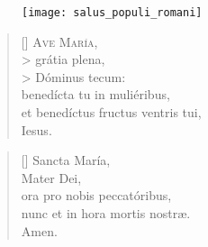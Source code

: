 \documentclass[omni.tex]{subfiles}
\begin{document}
\begin{figure}
{\begin{center}
    \texttt{[image: salus\_populi\_romani]}
\end{center}}
\end{figure}

\settowidth{\versewidth}{Et ne nos ind\'ucas in tentati\'onem}

\begin{verse}[\versewidth]
\lettrine[lhang=1.0,nindent=0em]{A}{ve Mar\'ia}, \\>
gr\'atia plena,\\>
D\'ominus tecum: \\
bened\'icta tu in muli\'eribus, \\
et bened\'ictus fructus ventris tui, \\
Iesus.
\end{verse}

\begin{verse}[\versewidth]
Sancta Mar\'ia, \\
Mater Dei, \\
ora pro nobis peccat\'oribus, \\
nunc et in hora mortis nostr\ae. \\
Amen. \\[4\baselineskip]
\end{verse}

\pagebreak
\end{document}
